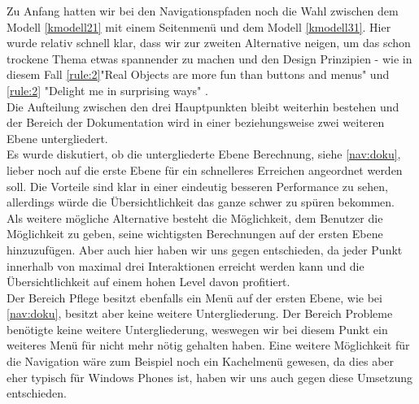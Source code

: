 Zu Anfang hatten wir bei den Navigationspfaden noch die Wahl zwischen dem Modell \ref{kmodell21} mit einem Seitenmenü und dem Modell \ref{kmodell31}. Hier wurde relativ schnell klar, dass wir zur zweiten Alternative neigen, um das schon trockene Thema etwas spannender zu machen und den Design Prinzipien - wie in diesem Fall \ref {rule:2}"Real Objects are more fun than buttons and menus" und \ref{rule:2} "Delight me in surprising ways" . \\
Die Aufteilung zwischen den drei Hauptpunkten bleibt weiterhin bestehen und der Bereich der Dokumentation wird in einer beziehungsweise zwei weiteren Ebene untergliedert. \\
Es wurde diskutiert, ob die untergliederte Ebene Berechnung, siehe \ref{nav:doku}, lieber noch auf die erste Ebene für ein schnelleres Erreichen angeordnet werden soll. Die Vorteile sind klar in einer eindeutig besseren Performance zu sehen, allerdings würde die Übersichtlichkeit das ganze schwer zu spüren bekommen.
\\Als weitere mögliche Alternative besteht die Möglichkeit, dem Benutzer die Möglichkeit zu geben, seine wichtigsten Berechnungen auf der ersten Ebene hinzuzufügen. Aber auch hier haben wir uns gegen entschieden, da jeder Punkt innerhalb von maximal drei Interaktionen erreicht werden kann und die Übersichtlichkeit auf einem hohen Level davon profitiert.\\

Der Bereich Pflege besitzt ebenfalls ein Menü auf der ersten Ebene, wie bei \ref{nav:doku}, besitzt aber keine weitere Untergliederung. Der Bereich Probleme benötigte keine weitere Untergliederung, weswegen wir bei diesem Punkt ein weiteres Menü für nicht mehr nötig gehalten haben. Eine weitere Möglichkeit für die Navigation wäre zum Beispiel noch ein Kachelmenü gewesen, da dies aber eher typisch für Windows Phones ist, haben wir uns auch gegen diese Umsetzung entschieden.

